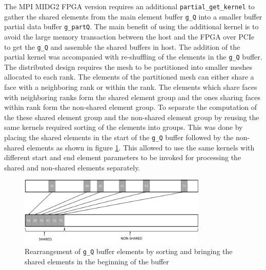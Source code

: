 The MPI MIDG2 FPGA version requires an additional \texttt{partial\_get\_kernel} to gather the shared elements from
the main element buffer \texttt{g\_Q} into a smaller buffer partial data buffer \texttt{g\_partQ}.
The main benefit of using the additional kernel is to avoid the large memory transaction between the
host and the FPGA over PCIe to get the \texttt{g\_Q} and assemble the shared buffers in host.
The addition of the partial kernel was accompanied with re-shuffling of the elements in the \texttt{g\_Q}
buffer. The distributed design requires the mesh to be partitioned into smaller meshes allocated
to each rank. The elements of the partitioned mesh can either share a face with a neighboring
rank or within the rank. The elements which share faces with neighboring ranks form the shared
element group and the ones sharing faces within rank form the non-shared element group.
To separate the computation of the these shared element group and the non-shared element group
by reusing the same kernels required sorting of the elements into groups. This was done by
placing the shared elements in the start of the \texttt{g\_Q} buffer followed by the non-shared
elements as shown in figure \ref{fig:rearrange}. This allowed to use the same kernels with different
start and end element parameters
to be invoked for processing the shared and non-shared elements separately.
\begin{figure}%
    \centering
    \includegraphics[width=0.8\textwidth]{images/rearrange}
    \caption{Rearrangement of \texttt{g\_Q} buffer elements by sorting and bringing the
    shared elements in the beginning of the buffer}
    \label{fig:rearrange}
\end{figure}


